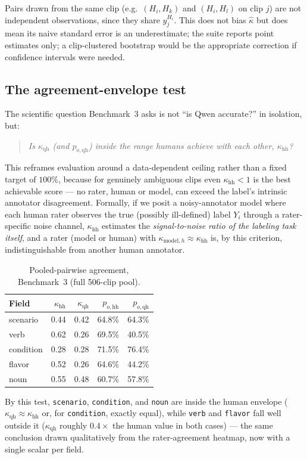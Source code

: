\begin{remark}
Pairs drawn from the same clip (e.g.\ $(H_i,H_k)$ and $(H_i,H_l)$ on clip
$j$) are not independent observations, since they share $y^{H_i}_j$. This
does not bias $\hat\kappa$ but does mean its naive standard error is an
underestimate; the suite reports point estimates only; a clip-clustered
bootstrap would be the appropriate correction if confidence intervals were
needed.
\end{remark}

\subsection{The agreement-envelope test}
\label{subsec:envelope}

The scientific question Benchmark~3 asks is not ``is Qwen accurate?''
in isolation, but:
\begin{quote}
  \emph{Is $\kappa_{\mathrm{qh}}$ (and $p_{o,\mathrm{qh}}$) inside the range
  humans achieve with each other, $\kappa_{\mathrm{hh}}$?}
\end{quote}
This reframes evaluation around a data-dependent ceiling rather than a
fixed target of $100\%$, because for genuinely ambiguous clips even
$\kappa_{\mathrm{hh}} < 1$ is the best achievable score --- no rater,
human or model, can exceed the label's intrinsic annotator disagreement.
Formally, if we posit a noisy-annotator model where each human rater
observes the true (possibly ill-defined) label $Y_i$ through a
rater-specific noise channel, $\kappa_{\mathrm{hh}}$ estimates the
\emph{signal-to-noise ratio of the labeling task itself}, and a rater
(model or human) with $\kappa_{\mathrm{model},h} \approx \kappa_{\mathrm{hh}}$
is, by this criterion, indistinguishable from another human annotator.

\begin{table}[h]
\centering
\begin{tabular}{lrrrr}
\toprule
Field & $\kappa_{\mathrm{hh}}$ & $\kappa_{\mathrm{qh}}$ & $p_{o,\mathrm{hh}}$ & $p_{o,\mathrm{qh}}$\\
\midrule
scenario  & 0.44 & 0.42 & 64.8\% & 64.3\% \\
verb      & 0.62 & 0.26 & 69.5\% & 40.5\% \\
condition & 0.28 & 0.28 & 71.5\% & 76.4\% \\
flavor    & 0.52 & 0.26 & 64.6\% & 44.2\% \\
noun      & 0.55 & 0.48 & 60.7\% & 57.8\% \\
\bottomrule
\end{tabular}
\caption{Pooled-pairwise agreement, Benchmark~3 (full 506-clip pool).}
\end{table}

By this test, \texttt{scenario}, \texttt{condition}, and \texttt{noun} are
inside the human envelope ($\kappa_{\mathrm{qh}} \approx \kappa_{\mathrm{hh}}$
or, for \texttt{condition}, exactly equal), while \texttt{verb} and
\texttt{flavor} fall well outside it ($\kappa_{\mathrm{qh}}$ roughly
$0.4\times$ the human value in both cases) --- the same conclusion drawn
qualitatively from the rater-agreement heatmap, now with a single scalar
per field.
